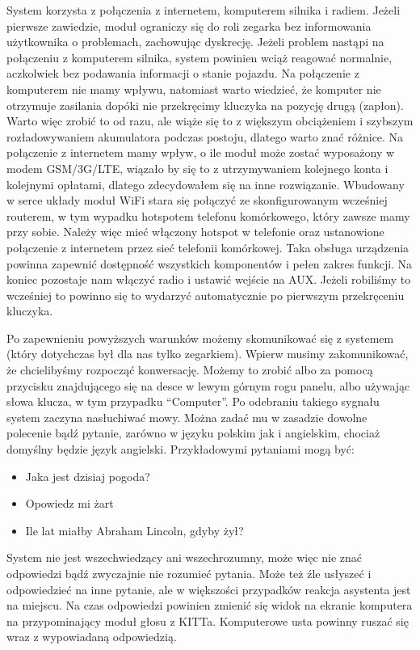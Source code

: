 \documentclass[declaration,shortabstract, inz]{iithesis}
\begin{document}
System korzysta z połączenia z internetem, komputerem silnika i radiem. Jeżeli pierwsze zawiedzie, moduł ograniczy się do roli zegarka bez informowania użytkownika o problemach, zachowując dyskrecję. Jeżeli problem nastąpi na połączeniu z komputerem silnika, system powinien wciąż reagować normalnie, aczkolwiek bez podawania informacji o stanie pojazdu. Na połączenie z komputerem nie mamy wpływu, natomiast warto wiedzieć, że komputer nie otrzymuje zasilania dopóki nie przekręcimy kluczyka na pozycję drugą (zapłon). Warto więc zrobić to od razu, ale wiąże się to z większym obciążeniem i szybszym rozładowywaniem akumulatora podczas postoju, dlatego warto znać różnice. Na połączenie z internetem mamy wpływ, o ile moduł może zostać wyposażony w modem GSM/3G/LTE, wiązało by się to z utrzymywaniem kolejnego konta i kolejnymi opłatami, dlatego zdecydowałem się na inne rozwiązanie. Wbudowany w serce układy moduł WiFi stara się połączyć ze skonfigurowanym wcześniej routerem, w tym wypadku hotspotem telefonu komórkowego, który zawsze mamy przy sobie. Należy więc mieć włączony hotspot w telefonie oraz ustanowione połączenie z internetem przez sieć telefonii komórkowej. Taka obsługa urządzenia powinna zapewnić dostępność wszystkich komponentów i pełen zakres funkcji. Na koniec pozostaje nam włączyć radio i ustawić wejście na AUX. Jeżeli robiliśmy to wcześniej to powinno się to wydarzyć automatycznie po pierwszym przekręceniu kluczyka.

Po zapewnieniu powyższych warunków możemy skomunikować się z systemem (który dotychczas był dla nas tylko zegarkiem). Wpierw musimy zakomunikować, że chcielibyśmy rozpocząć konwersację. Możemy to zrobić albo za pomocą przycisku znajdującego się na desce w lewym górnym rogu panelu, albo używając słowa klucza, w tym przypadku ``Computer''. Po odebraniu takiego sygnału system zaczyna nasłuchiwać mowy. Można zadać mu w zasadzie dowolne polecenie bądź pytanie, zarówno w języku polskim jak i angielskim, chociaż domyślny będzie język angielski. Przykładowymi pytaniami mogą być:
\begin{itemize}
  \item Jaka jest dzisiaj pogoda?
  \item Opowiedz mi żart
  \item Ile lat miałby Abraham Lincoln, gdyby żył?
\end{itemize}
System nie jest wszechwiedzący ani wszechrozumny, może więc nie znać odpowiedzi bądź zwyczajnie nie rozumieć pytania. Może też źle usłyszeć i odpowiedzieć na inne pytanie, ale w większości przypadków reakcja asystenta jest na miejscu. Na czas odpowiedzi powinien zmienić się widok na ekranie komputera na przypominający moduł głosu z KITTa. Komputerowe usta powinny ruszać się wraz z wypowiadaną odpowiedzią.
\end{document}
